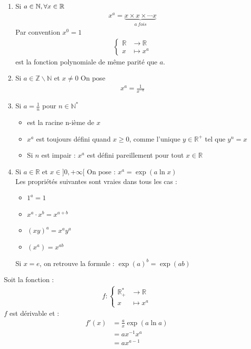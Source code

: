 \begin{enumerate}
	\item Si $a \in \mathbb{N}, \forall x \in \mathbb{R}$
	\begin{align*}
		x^a = \underbrace{x \times x \times \cdots x}_{a \ fois}
	\end{align*}
	Par convention $x^0 = 1$
	\begin{align*}
		\begin{cases}
			\mathbb{R} &\to \mathbb{R} \\
			x &\mapsto x^a 
		\end{cases}
	\end{align*}
	est la fonction polynomiale de même parité que $a$.
	\item Si $a \in \mathbb{Z} \backslash \mathbb{N}$ et $x \neq 0$
	On pose 
	\begin{align*}
		x^a = \frac{1}{x^{-a}}
	\end{align*}
	\item Si $a = \frac{1}{n}$ pour $n \in \mathbb{N}^*$
	\begin{itemize}
		\item est la racine n-ième de $x$
		\item  $x^a$ est toujours défini quand $x \geqslant 0$, comme l'unique $y \in \mathbb{R}^+$ tel que $y^n = x$
		\item Si $n$ est impair : $x^a$ est défini pareillement pour tout $x \in \mathbb{R}$
	\end{itemize}
	\item Si $a \in \mathbb{R}$ et $x \in ]0, +\infty[$
	On pose : $x^a = \exp{(a \ln{x})}$ \\
	Les propriétés suivantes sont vraies dans tous les cas : 
	\begin{itemize}
		\item $1^a = 1$
		\item $x^a \cdot x^b = x^{a+b}$
		\item $(xy)^a = x^a y^a$
		\item $(x^a) = x^{ab}$
	\end{itemize}
	Si $x = e$, on retrouve la formule : $\exp{(a)}^b = \exp{(ab)}$
\end{enumerate}

\begin{graybox}
	\begin{proposition}
		Soit la fonction :
		\begin{align*}
			f :
			\begin{cases}
				\mathbb{R}^*_+ &\to \mathbb{R} \\
				x &\mapsto x^a
			\end{cases}
		\end{align*}
		$f$ est dérivable et :
		\begin{align*}
			f'(x) &= \frac{a}{x} \exp{(a\ln{a})}  \\
			&= a x^{-1}x^a  \\
			&= a x^{a - 1}
		\end{align*}    
	\end{proposition}
\end{graybox}

